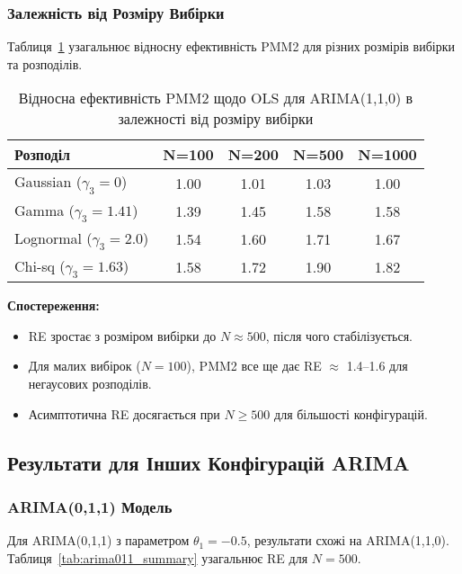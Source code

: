 \documentclass[12pt,a4paper]{article}
\begin{document}
\subsubsection{Залежність від Розміру Вибірки}

Таблиця~\ref{tab:re_vs_sample_size} узагальнює відносну ефективність PMM2 для різних розмірів вибірки та розподілів.

\begin{table}[h]
\centering
\caption{Відносна ефективність PMM2 щодо OLS для ARIMA(1,1,0) в залежності від розміру вибірки}
\label{tab:re_vs_sample_size}
\begin{tabular}{@{}lcccc@{}}
\toprule
\textbf{Розподіл} & \textbf{N=100} & \textbf{N=200} & \textbf{N=500} & \textbf{N=1000} \\
\midrule
Gaussian ($\gamma_3=0$)    & 1.00 & 1.01 & 1.03 & 1.00 \\
Gamma ($\gamma_3=1.41$)    & 1.39 & 1.45 & 1.58 & 1.58 \\
Lognormal ($\gamma_3=2.0$) & 1.54 & 1.60 & 1.71 & 1.67 \\
Chi-sq ($\gamma_3=1.63$)   & 1.58 & 1.72 & 1.90 & 1.82 \\
\bottomrule
\end{tabular}
\end{table}

\textbf{Спостереження:}
\begin{itemize}
    \item RE зростає з розміром вибірки до $N \approx 500$, після чого стабілізується.
    \item Для малих вибірок ($N = 100$), PMM2 все ще дає RE $\approx$ 1.4--1.6 для негаусових розподілів.
    \item Асимптотична RE досягається при $N \geq 500$ для більшості конфігурацій.
\end{itemize}

\subsection{Результати для Інших Конфігурацій ARIMA}
\label{subsec:other_configurations}

\subsubsection{ARIMA(0,1,1) Модель}

Для ARIMA(0,1,1) з параметром $\theta_1 = -0.5$, результати схожі на ARIMA(1,1,0). Таблиця~\ref{tab:arima011_summary} узагальнює RE для $N = 500$.
\end{document}
